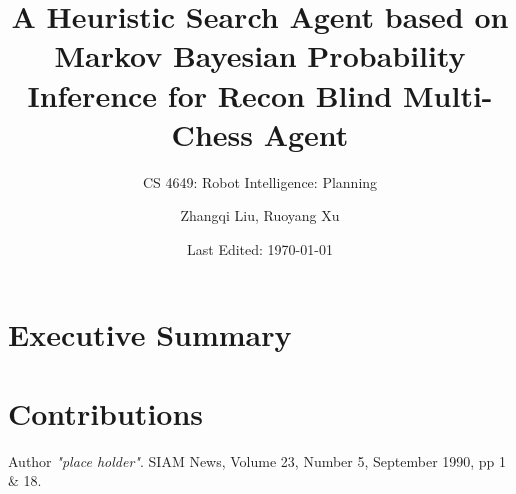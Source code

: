 \documentclass[11pt]{article}
\title{A Heuristic Search Agent based on Markov Bayesian Probability Inference for Recon Blind Multi-Chess Agent}
\author{Zhangqi Liu, Ruoyang Xu}
\subtitle{CS 4649: Robot Intelligence: Planning}
\date{Last Edited: \today}
\begin{document}
\maketitle
\pagebreak

\section{Executive Summary}
\section{Contributions}

\begin{thebibliography}{9}
    Author
    \textit{"place holder"}. 
    SIAM News, Volume 23, Number 5, September 1990, pp 1 \& 18. 
\end{thebibliography}
\end{document}
